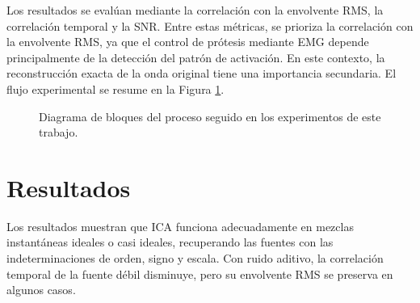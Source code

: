 Los resultados se evalúan mediante la correlación con la envolvente RMS, la correlación temporal y la SNR. Entre estas métricas, se prioriza la correlación con la envolvente RMS, ya que el control de prótesis mediante EMG depende principalmente de la detección del patrón de activación. En este contexto, la reconstrucción exacta de la onda original tiene una importancia secundaria. El flujo experimental se resume en la Figura \ref{fig:methodoloy_pipeline2}.
\\
\begin{figure}[H]
    \centering
    \caption{Diagrama de bloques del proceso seguido en los experimentos de este trabajo.}
    \label{fig:methodoloy_pipeline2}
\end{figure}

\section*{Resultados}

Los resultados muestran que ICA funciona adecuadamente en mezclas instantáneas ideales o casi ideales, recuperando las fuentes con las indeterminaciones de orden, signo y escala. Con ruido aditivo, la correlación temporal de la fuente débil disminuye, pero su envolvente RMS se preserva en algunos casos.


